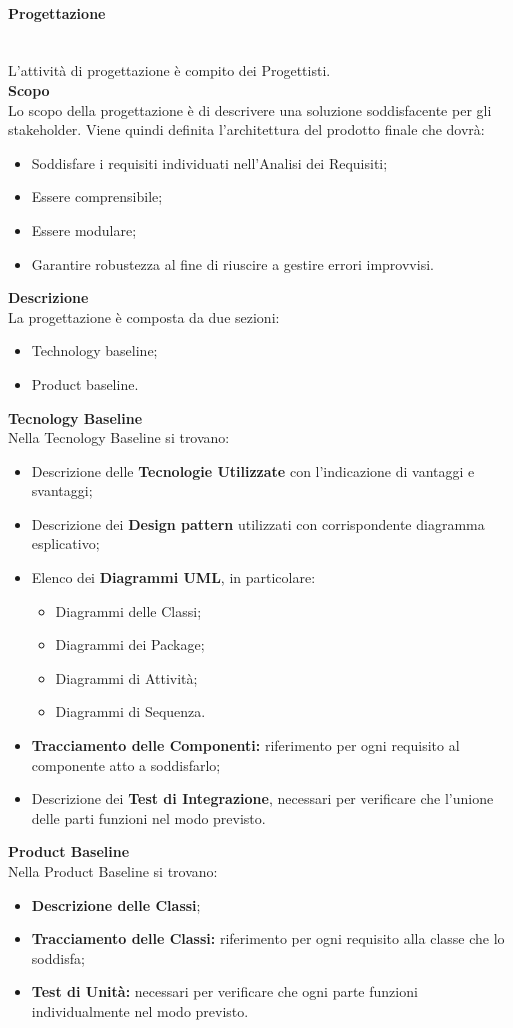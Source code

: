 \paragraph{Progettazione} \mbox{} \\
L'attività di progettazione è compito dei Progettisti.
\\ \textbf{Scopo}\\
Lo scopo della progettazione è di descrivere una soluzione soddisfacente per gli stakeholder. 
Viene quindi definita l'architettura del prodotto finale che dovrà:
\begin{itemize}
	\item Soddisfare i requisiti individuati nell'Analisi dei Requisiti;
	\item Essere comprensibile;
	\item Essere modulare;
	\item Garantire robustezza al fine di riuscire a gestire errori improvvisi.
\end{itemize}
\textbf{Descrizione}\\
La progettazione è composta da due sezioni:
\begin{itemize}
	\item Technology baseline;
	\item Product baseline.	
\end{itemize}
\textbf{Tecnology Baseline}\\
Nella Tecnology Baseline si trovano:
\begin{itemize}
	\item Descrizione delle \textbf{Tecnologie Utilizzate} con l'indicazione di vantaggi e svantaggi;
	\item Descrizione dei \textbf{Design pattern} utilizzati con corrispondente diagramma esplicativo;
	\item Elenco dei \textbf{Diagrammi UML}, in particolare:
	\begin{itemize}
		\item Diagrammi delle Classi;
		\item Diagrammi dei Package;
		\item Diagrammi di Attività;
		\item Diagrammi di Sequenza.
	\end{itemize}
	\item \textbf{Tracciamento delle Componenti:} riferimento per ogni requisito al componente atto a soddisfarlo;
	\item Descrizione dei \textbf{Test di Integrazione}, necessari per verificare che l'unione delle parti funzioni nel modo previsto.
\end{itemize}
\textbf{Product Baseline}\\
Nella Product Baseline si trovano:
\begin{itemize}
	\item \textbf{Descrizione delle Classi};
	\item \textbf{Tracciamento delle Classi:} riferimento per ogni requisito alla classe che lo soddisfa;
	\item \textbf{Test di Unità:} necessari per verificare che ogni parte funzioni individualmente nel modo previsto.
\end{itemize}
